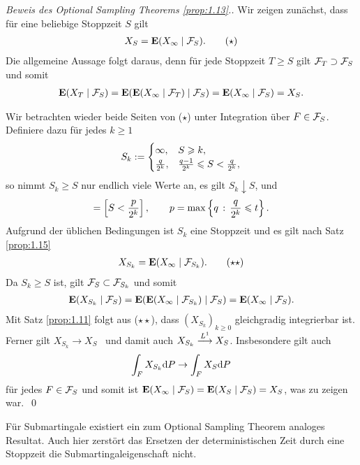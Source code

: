 \begin{proof}[Beweis des Optional Sampling Theorems \ref{prop:1.13}.]
Wir zeigen zunächst, dass für eine beliebige Stoppzeit $S$ gilt
\begin{align*}
X_S = \E(X_\infty\mid\FF_S).\tag{\ensuremath{\star}}
\end{align*}
Die allgemeine Aussage folgt daraus, denn
für jede Stoppzeit $T\ge S$ gilt $\mathcal{F}_T\supset \mathcal{F}_S$ und somit
\begin{align*}
\mathbf{E}(X_T\mid\mathcal{F}_S) = \mathbf{E}(\mathbf{E}(X_\infty\mid\mathcal{F}_T)\mid\mathcal{F}_S) = 
\mathbf{E}(X_\infty\mid\mathcal{F}_S) = X_S.
\end{align*}

Wir betrachten wieder beide Seiten von ($\star$) unter Integration über
$F\in\mathcal{F}_S$. Definiere dazu für jedes $k\ge 1$
\begin{align*}
S_k:= \begin{cases}
\infty, & S\geqslant k,\\
\frac{q}{2^k}, & \frac{q-1}{2^k} \leqslant S < \frac{q}{2^k},
\end{cases}
\end{align*}
so nimmt $S_k\ge S$ nur endlich viele Werte an, es gilt  $S_k \downarrow S$, und
\begin{align*}
[S_k\le t] = 
\left[S < \frac{p}{2^k}\right],\qquad p = \max\setdef*{q}{\frac{q}{2^k}\le t}.
\end{align*}
Aufgrund der üblichen Bedingungen ist $S_k$ eine Stoppzeit und es gilt nach
Satz \ref{prop:1.15}
\begin{align*}
X_{S_k} = \E(X_\infty\mid \FF_{S_k}).\tag{\ensuremath{\star\star}}
\end{align*}
Da $S_k\ge S$ ist, gilt $\mathcal{F}_{S}\subset \mathcal{F}_{S_k}$ und somit
\begin{align*}
\mathbf{E}(X_{S_k}\mid\mathcal{F}_S) = \mathbf{E}(\mathbf{E}(X_\infty\mid\mathcal{F}_{S_k})\mid \mathcal{F}_S) =
\mathbf{E}(X_\infty\mid \mathcal{F}_S).
\end{align*}
Mit Satz \ref{prop:1.11} folgt aus ($\star\star$), dass $(X_{S_k})_{k\ge 0}$
gleichgradig integrierbar ist. Ferner gilt $X_{S_k}\to X_S$ \fs\ und damit auch
$X_{S_k}\overset{L^1}{\longrightarrow} X_S$. Insbesondere gilt auch
\begin{align*}
\int_F X_{S_k}\mathrm{d} P\to \int_F X_S\mathrm{d} P
\end{align*}
für jedes $F\in\mathcal{F}_S$ und somit ist $\mathbf{E}(X_\infty\mid \mathcal{F}_S) =
\mathbf{E}(X_{S}\mid\mathcal{F}_S) = X_S$, was zu zeigen war.~\qed
\end{proof}

Für Submartingale existiert ein zum Optional Sampling Theorem
analoges Resultat. Auch hier zerstört das Ersetzen der deterministischen Zeit
durch eine Stoppzeit die Submartingaleigenschaft nicht.

